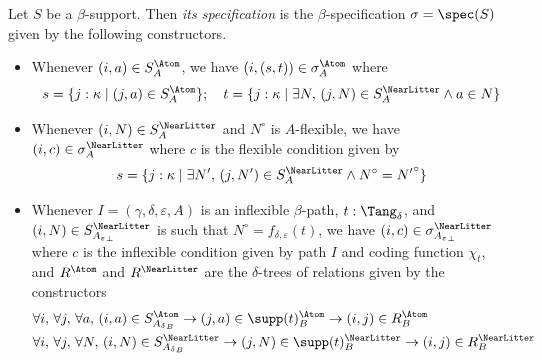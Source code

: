 \begin{definition}
  \label{def:StrSupport.spec}
  Let \( S \) be a \( \beta \)-support.
  Then \emph{its specification} is the \( \beta \)-specification \( \sigma = \spec(S) \) given by the following constructors.
  \begin{itemize}
    \item Whenever \( (i, a) \in S_A^\Atom \), we have \( (i, (s, t)) \in \sigma_A^\Atom \) where
    \[ s = \{ j : \kappa \mid (j, a) \in S_A^\Atom \};\quad t = \{ j : \kappa \mid \exists N,\, (j, N) \in S_A^\NearLitter \wedge a \in N \} \]
    \item Whenever \( (i, N) \in S_A^\NearLitter \) and \( N^\circ \) is \( A \)-flexible, we have \( (i, c) \in \sigma_A^\NearLitter \) where \( c \) is the flexible condition given by
    \[ s = \{ j : \kappa \mid \exists N',\, (j, N') \in S_A^\NearLitter \wedge N^\circ = {N'}^\circ \} \]
    \item Whenever \( I = (\gamma,\delta,\varepsilon,A) \) is an inflexible \( \beta \)-path, \( t : \Tang_\delta \), and \( (i, N) \in S_{{A_\varepsilon}_\bot}^\NearLitter \) is such that \( N^\circ = f_{\delta,\varepsilon}(t) \), we have \( (i, c) \in \sigma_{{A_\varepsilon}_\bot}^\NearLitter \) where \( c \) is the inflexible condition given by path \( I \) and coding function \( \chi_t \), and \( R^\Atom \) and \( R^\NearLitter \) are the \( \delta \)-trees of relations given by the constructors
    \begin{align*}
      &\forall i,\, \forall j,\, \forall a,\, (i, a) \in S_{{A_\delta}_B}^\Atom \to (j, a) \in \supp(t)_B^\Atom \to (i, j) \in R_B^\Atom \\
      &\forall i,\, \forall j,\, \forall N,\, (i, N) \in S_{{A_\delta}_B}^\NearLitter \to (j, N) \in \supp(t)_B^\NearLitter \to (i, j) \in R_B^\NearLitter
    \end{align*}
  \end{itemize}
\end{definition}
